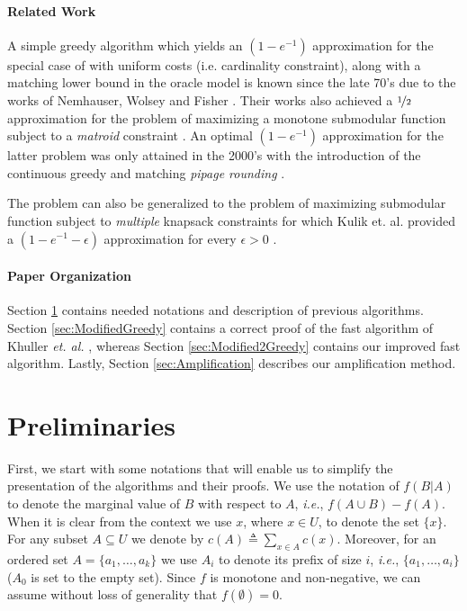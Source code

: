 \documentclass[a4paper]{article}
\begin{document}
\paragraph*{Related Work}

A simple greedy algorithm which yields an $(1-e^{-1})$ approximation for the special
case of \SK with uniform costs (i.e. cardinality constraint), along with a matching 
lower bound in the oracle model is known since the late 70's due to the
works of Nemhauser, Wolsey and Fisher \cite{Nemhauser1978}\cite{NW78}.
Their works also achieved a $\nicefrac[]{1}{2}$ approximation for the problem
of maximizing a monotone submodular function subject to a {\em matroid}
constraint \cite{FNW78}. 
An optimal $(1-e^{-1})$ approximation for the latter problem was only attained in the 2000's with 
the introduction of the {continuous greedy} and matching 
	{\em pipage rounding } \cite{CCPV11}.

The problem can also be generalized to the problem of maximizing submodular function
subject to {\em multiple} knapsack constraints for which Kulik et. al. provided a $(1-e^{-1}-\epsilon)$ approximation for every $\epsilon>0$ \cite{KST13}.  


\paragraph*{Paper Organization}
Section \ref{sec:Preliminaries} contains needed notations and description of previous algorithms.
Section \ref{sec:ModifiedGreedy} contains a correct proof of the fast algorithm of Khuller {\em et. al.} \cite{khuller1999budgeted}, whereas Section \ref{sec:Modified2Greedy} contains our improved fast algorithm.
Lastly, Section \ref{sec:Amplification} describes our amplification method. 

\section{Preliminaries}\label{sec:Preliminaries}
First, we start with some notations that will enable us to simplify the presentation of the algorithms and their proofs.
We use the notation of $f(B|A)$ to denote the marginal value of $B$ with respect to $A$, {\em i.e.}, $f(A\cup B)-f(A)$.
When it is clear from the context we use $x$, where $x\in U$, to denote the set $\{ x\}$.
For any subset $A\subseteq U$ we denote by $c(A)\triangleq \sum _{x\in A}c(x)$.
Moreover, for an ordered set $A = \{a_1, \dots, a_k\}$ we use $A_i$ to denote its prefix of size $i$, {\em i.e.}, $\{a_1, \dots, a_i\}$ ($A_0$ is set to the empty set).
Since $f$ is monotone and non-negative, we can assume without loss of generality that $f(\emptyset)=0$.
\end{document}
